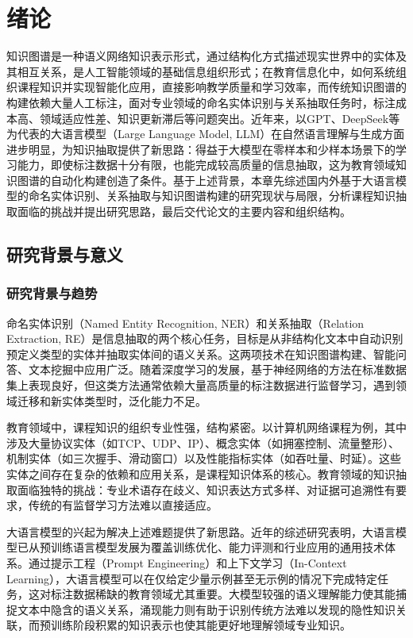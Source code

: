 
\section{绪\hspace{1em}论}

知识图谱是一种语义网络知识表示形式，通过结构化方式描述现实世界中的实体及其相互关系，是人工智能领域的基础信息组织形式；在教育信息化中，如何系统组织课程知识并实现智能化应用，直接影响教学质量和学习效率，而传统知识图谱的构建依赖大量人工标注，面对专业领域的命名实体识别与关系抽取任务时，标注成本高、领域适应性差、知识更新滞后等问题突出。近年来，以GPT、DeepSeek等为代表的大语言模型（Large Language Model, LLM）在自然语言理解与生成方面进步明显，为知识抽取提供了新思路：得益于大模型在零样本和少样本场景下的学习能力，即使标注数据十分有限，也能完成较高质量的信息抽取，这为教育领域知识图谱的自动化构建创造了条件。基于上述背景，本章先综述国内外基于大语言模型的命名实体识别、关系抽取与知识图谱构建的研究现状与局限，分析课程知识抽取面临的挑战并提出研究思路，最后交代论文的主要内容和组织结构。

\subsection{研究背景与意义}

\subsubsection{研究背景与趋势}

命名实体识别（Named Entity Recognition, NER）和关系抽取（Relation Extraction, RE）是信息抽取的两个核心任务，目标是从非结构化文本中自动识别预定义类型的实体并抽取实体间的语义关系。这两项技术在知识图谱构建、智能问答、文本挖掘中应用广泛\cite{ner_survey_2024,generative_ie_survey_2023}。随着深度学习的发展\cite{zhouzhihua2016}，基于神经网络的方法在标准数据集上表现良好，但这类方法通常依赖大量高质量的标注数据进行监督学习，遇到领域迁移和新实体类型时，泛化能力不足。

教育领域中，课程知识的组织专业性强，结构紧密。以计算机网络课程为例，其中涉及大量协议实体（如TCP、UDP、IP）、概念实体（如拥塞控制、流量整形）、机制实体（如三次握手、滑动窗口）以及性能指标实体（如吞吐量、时延）。这些实体之间存在复杂的依赖和应用关系，是课程知识体系的核心。教育领域的知识抽取面临独特的挑战：专业术语存在歧义、知识表达方式多样、对证据可追溯性有要求，传统的有监督学习方法难以直接适应。

大语言模型的兴起为解决上述难题提供了新思路。近年的综述研究表明，大语言模型已从预训练语言模型发展为覆盖训练优化、能力评测和行业应用的通用技术体系\cite{wangyaozu2024_llm_survey}。通过提示工程（Prompt Engineering）和上下文学习（In-Context Learning），大语言模型可以在仅给定少量示例甚至无示例的情况下完成特定任务\cite{llms_kg_survey_2023}，这对标注数据稀缺的教育领域尤其重要。大模型较强的语义理解能力使其能捕捉文本中隐含的语义关系，涌现能力则有助于识别传统方法难以发现的隐性知识关联，而预训练阶段积累的知识表示也使其能更好地理解领域专业知识。

